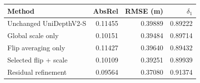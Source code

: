 \begin{tabular}{lrrr}
\toprule Method & AbsRel & RMSE (m) & $\delta_1$\\
\midrule
Unchanged UniDepthV2-S & 0.11455 & 0.39889 & 0.89222\\
Global scale only & 0.10151 & 0.39484 & 0.89714\\
Flip averaging only & 0.11427 & 0.39640 & 0.89432\\
Selected flip + scale & 0.10109 & 0.39251 & 0.89939\\
Residual refinement & 0.09564 & 0.37080 & 0.91374\\
\bottomrule
\end{tabular}

